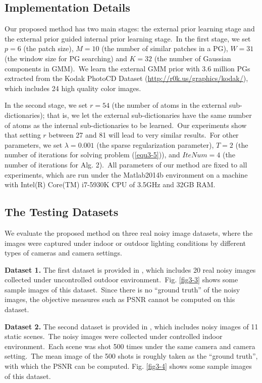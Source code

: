 \subsection{Implementation Details}

Our proposed method has two main stages: the external prior learning stage and the external prior guided internal prior learning stage.\ In the first stage, we set $p = 6$ (the patch size), $M = 10$ (the number of similar patches in a PG), $W = 31$ (the window size for PG searching) and $K = 32$ (the number of Gaussian components in GMM).\ We learn the external GMM prior with 3.6 million PGs extracted from the Kodak PhotoCD Dataset (\url{http://r0k.us/graphics/kodak/}), which includes 24 high quality color images. 

In the second stage, we set $r = 54$ (the number of atoms in the external sub-dictionaries); that is, we let the external sub-dictionaries have the same number of atoms as the internal sub-dictionaries to be learned.\ Our experiments show that setting $r$ between 27 and 81 will lead to very similar results.\ For other parameters, we set $\lambda=0.001$ (the sparse regularization parameter), $T = 2$ (the number of iterations for solving problem (\ref{equ3-5})), and $IteNum = 4$ (the number of iterations for Alg. 2).\ All parameters of our method are fixed to all experiments, which are run under the Matlab2014b environment on a machine with Intel(R) Core(TM) i7-5930K CPU of 3.5GHz and 32GB RAM.

\subsection{The Testing Datasets}

We evaluate the proposed method on three real noisy image datasets, where the images were captured under indoor or outdoor lighting conditions by different types of cameras and camera settings. 

\textbf{Dataset 1.} The first dataset is provided in \cite{ncwebsite}, which includes 20 real noisy images collected under uncontrolled outdoor environment.\ Fig. \ref{fig3-3} shows some sample images of this dataset.\ Since there is no ``ground truth'' of the noisy images, the objective measures such as PSNR cannot be computed on this dataset. 

\textbf{Dataset 2.} The second dataset is provided in \cite{crosschannel2016}, which includes noisy images of 11 static scenes.\ The noisy images were collected under controlled indoor environment.\ Each scene was shot 500 times under the same camera and camera setting.\ The mean image of the 500 shots is roughly taken as the ``ground truth'', with which the PSNR can be computed. Fig. \ref{fig3-4} shows some sample images of this dataset. 

